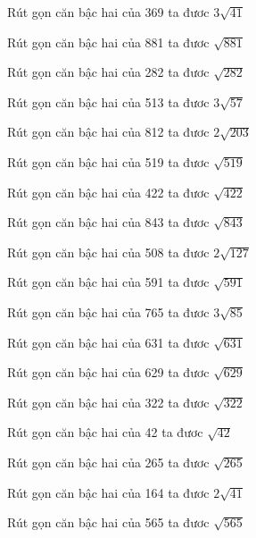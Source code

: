 \documentclass[12pt,a4paper]{article}
\begin{document}
\begin{ex}
Rút gọn căn bậc hai của 369 ta đươc $3\sqrt{41}$
\end{ex}
\begin{ex}
Rút gọn căn bậc hai của 881 ta đươc $\sqrt{881}$
\end{ex}
\begin{ex}
Rút gọn căn bậc hai của 282 ta đươc $\sqrt{282}$
\end{ex}
\begin{ex}
Rút gọn căn bậc hai của 513 ta đươc $3\sqrt{57}$
\end{ex}
\begin{ex}
Rút gọn căn bậc hai của 812 ta đươc $2\sqrt{203}$
\end{ex}
\begin{ex}
Rút gọn căn bậc hai của 519 ta đươc $\sqrt{519}$
\end{ex}
\begin{ex}
Rút gọn căn bậc hai của 422 ta đươc $\sqrt{422}$
\end{ex}
\begin{ex}
Rút gọn căn bậc hai của 843 ta đươc $\sqrt{843}$
\end{ex}
\begin{ex}
Rút gọn căn bậc hai của 508 ta đươc $2\sqrt{127}$
\end{ex}
\begin{ex}
Rút gọn căn bậc hai của 591 ta đươc $\sqrt{591}$
\end{ex}
\begin{ex}
Rút gọn căn bậc hai của 765 ta đươc $3\sqrt{85}$
\end{ex}
\begin{ex}
Rút gọn căn bậc hai của 631 ta đươc $\sqrt{631}$
\end{ex}
\begin{ex}
Rút gọn căn bậc hai của 629 ta đươc $\sqrt{629}$
\end{ex}
\begin{ex}
Rút gọn căn bậc hai của 322 ta đươc $\sqrt{322}$
\end{ex}
\begin{ex}
Rút gọn căn bậc hai của 42 ta đươc $\sqrt{42}$
\end{ex}
\begin{ex}
Rút gọn căn bậc hai của 265 ta đươc $\sqrt{265}$
\end{ex}
\begin{ex}
Rút gọn căn bậc hai của 164 ta đươc $2\sqrt{41}$
\end{ex}
\begin{ex}
Rút gọn căn bậc hai của 565 ta đươc $\sqrt{565}$
\end{ex}
\end{document}
